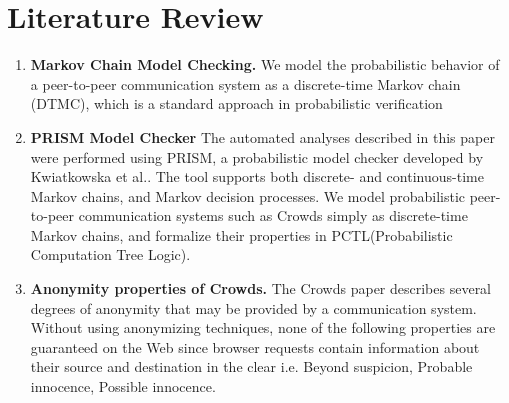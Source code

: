 \documentclass{article}
\begin{document}
\section{Literature Review}

\begin{enumerate}
\item \textbf{{Markov Chain Model Checking.}}\newline
 We model the probabilistic behavior of a peer-to-peer communication system as a discrete-time Markov chain (DTMC), which is a standard approach in probabilistic verification
\item \textbf{{ PRISM Model Checker}}\newline
 The automated analyses described in this paper were performed using PRISM, a
probabilistic model checker developed by Kwiatkowska et al.. The tool supports both discrete- and continuous-time Markov chains, and Markov decision processes. We model probabilistic peer-to-peer communication systems such as Crowds simply as discrete-time Markov chains, and formalize their properties in PCTL(Probabilistic Computation Tree Logic).
\item\textbf{{ Anonymity properties of Crowds.}}\newline
 The Crowds paper describes several degrees of anonymity that may be provided by a communication system. Without using anonymizing techniques, none of the following properties are guaranteed on the Web since browser requests contain information about their source and destination in the clear i.e. Beyond suspicion, Probable innocence, Possible innocence.
\end{enumerate}
\end{document}
